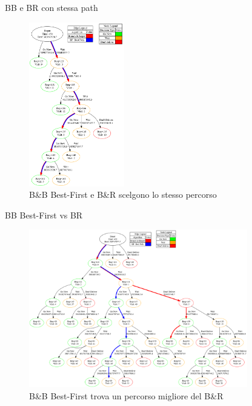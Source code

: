 \documentclass[10pt]{beamer}
\begin{document}
    \begin{frame}{BB e BR con stessa path}
            \begin{figure}[!h]
                \centering
                \includegraphics[width=0.37\textwidth]{Images/same_path.png}
                \caption{B\&B Best-First e B\&R scelgono lo stesso percorso}
            \label{fig:BBBFuguale}
            \end{figure}
    \end{frame}

    \begin{frame}{BB Best-First vs BR}
        \begin{figure}[h!]
            \centering
            \includegraphics[width=0.85\textwidth]{Images/omg.png}
            \caption{B\&B Best-First trova un percorso migliore del B\&R}
        \label{fig:BBBFmigliore}
        \end{figure}
    \end{frame}
\end{document}
